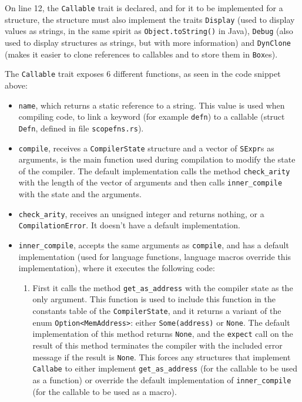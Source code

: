 \documentclass[11pt]{scrreprt}
\begin{document}
On line 12, the \texttt{Callable} trait is declared, and for it to be implemented for a structure, the structure must also implement the traits \texttt{Display} (used to display values as strings, in the same spirit as \texttt{Object.toString()} in Java), \texttt{Debug} (also used to display structures as strings, but with more information) and \texttt{DynClone} (makes it easier to clone references to callables and to store them in \texttt{Box}es).

The \texttt{Callable} trait exposes 6 different functions, as seen in the code snippet above:
\begin{itemize}
  \item \texttt{name}, which returns a static reference to a string. This value is used when compiling code, to link a keyword (for example \texttt{defn}) to a callable (struct \texttt{Defn}, defined in file \texttt{scopefns.rs}).
  \item \texttt{compile}, receives a \texttt{CompilerState} structure and a vector of \texttt{SExpr}s as arguments, is the main function used during compilation to modify the state of the compiler. The default implementation calls the method \texttt{check\_arity} with the length of the vector of arguments and then calls \texttt{inner\_compile} with the state and the arguments.
  \item \texttt{check\_arity}, receives an unsigned integer and returns nothing, or a \texttt{CompilationError}. It doesn't have a default implementation.
  \item \texttt{inner\_compile}, accepts the same arguments as \texttt{compile}, and has a default implementation (used for language functions, language macros override this implementation), where it executes the following code:
  \begin{enumerate}
    \item First it calls the method \texttt{get\_as\_address} with the compiler state as the only argument. This function is used to include this function in the constants table of the \texttt{CompilerState}, and it returns a variant of the enum \texttt{Option<MemAddress>}: either \texttt{Some(address)} or \texttt{None}. The default implementation of this method returns \texttt{None}, and the \texttt{expect} call on the result of this method terminates the compiler with the included error message if the result is \texttt{None}. This forces any structures that implement \texttt{Callabe} to either implement \texttt{get\_as\_address} (for the callable to be used as a function) or override the default implementation of \texttt{inner\_compile} (for the callable to be used as a macro).

\end{enumerate}
\end{itemize}
\end{document}
